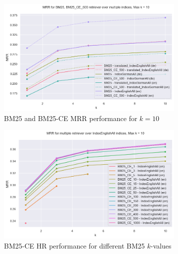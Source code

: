 \begin{figure}
    \centering
    \begin{subfigure}{.5\textwidth}
        \centering
        \includegraphics[width=\linewidth]{Grafiken/Evaluation/Data_Generation/BM25_vs_BM25_CE_MRR.png}
        \captionsetup{width=.9\linewidth}
        \caption{BM25 and BM25-CE MRR performance for $k = 10$}
        \label{fig:retriever-performance-bm25-vs-bm25-ce-mrr}
    \end{subfigure}%
    \begin{subfigure}{.5\textwidth}
        \centering
        \includegraphics[width=\linewidth]{Grafiken/Evaluation/Data_Generation/BM25_CE_k.png}
        \captionsetup{width=.9\linewidth}
        \caption{BM25-CE HR performance for different BM25 $k$-values}
        \label{fig:retriever-performance-bm25-ce-k}
    \end{subfigure}
    \begin{subfigure}{.5\textwidth}
        \centering

\end{subfigure}
\end{figure}

